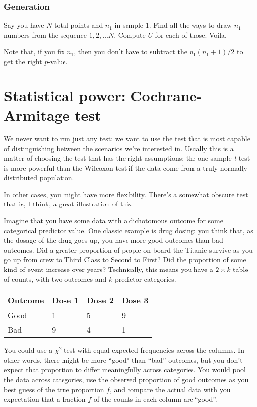 \subsubsection{Generation}\label{generation}

Say you have \(N\) total points and \(n_1\) in sample 1. Find all the
ways to draw \(n_1\) numbers from the sequence \(1, 2, \ldots N\).
Compute \(U\) for each of those. Voila.

Note that, if you fix \(n_1\), then you don't have to subtract the
\(n_1(n_1+1)/2\) to get the right \(p\)-value.

\section{Statistical power: Cochrane-Armitage
test}\label{statistical-power-cochrane-armitage-test}

We never want to run just any test: we want to use the test that is most
capable of distinguishing between the scenarios we're interested in.
Usually this is a matter of choosing the test that has the right
assumptions: the one-sample \emph{t}-test is more powerful than the
Wilcoxon test if the data come from a truly normally-distributed
population.

In other cases, you might have more flexibility. There's a somewhat
obscure test that is, I think, a great illustration of this.

Imagine that you have some data with a dichotomous outcome for some
categorical predictor value. One classic example is drug dosing: you
think that, as the dosage of the drug goes up, you have more good
outcomes than bad outcomes. Did a greater proportion of people on board
the Titanic survive as you go up from crew to Third Class to Second to
First? Did the proportion of some kind of event increase over years?
Technically, this means you have a \(2 \times k\) table of counts, with
two outcomes and \(k\) predictor categories.

\begin{longtable}[]{@{}llll@{}}
\toprule
Outcome & Dose 1 & Dose 2 & Dose 3\tabularnewline
\midrule
\endhead
Good & 1 & 5 & 9\tabularnewline
Bad & 9 & 4 & 1\tabularnewline
\bottomrule
\end{longtable}

You could use a \(\chi^2\) test with equal expected frequencies across
the columns. In other words, there might be more ``good'' than ``bad''
outcomes, but you don't expect that proportion to differ meaningfully
across categories. You would pool the data across categories, use the
observed proportion of good outcomes as you best guess of the true
proportion \(f\), and compare the actual data with you expectation that
a fraction \(f\) of the counts in each column are ``good''.


